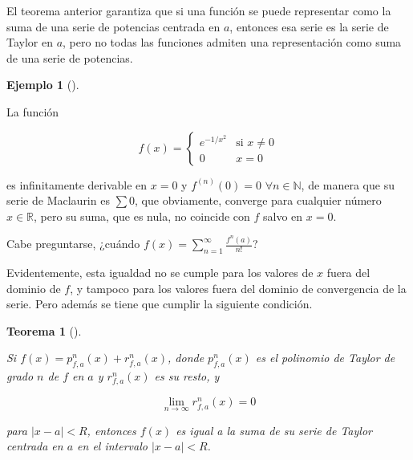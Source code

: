 \documentclass[
  a4paper,
]{scrreport}
\theoremstyle{plain}
\theoremstyle{plain}
\theoremstyle{definition}
\theoremstyle{definition}
\newtheorem{example}{Ejemplo}[chapter]
\theoremstyle{plain}
\newtheorem{theorem}{Teorema}[chapter]
\theoremstyle{remark}
\begin{document}
\begin{tcolorbox}[enhanced jigsaw, breakable, bottomrule=.15mm, coltitle=black, bottomtitle=1mm, opacityback=0, title=\textcolor{quarto-callout-warning-color}{\faExclamationTriangle}\hspace{0.5em}{Advertencia}, left=2mm, toptitle=1mm, toprule=.15mm, opacitybacktitle=0.6, colframe=quarto-callout-warning-color-frame, arc=.35mm, colback=white, rightrule=.15mm, titlerule=0mm, leftrule=.75mm, colbacktitle=quarto-callout-warning-color!10!white]

El teorema anterior garantiza que si una función se puede representar
como la suma de una serie de potencias centrada en \(a\), entonces esa
serie es la serie de Taylor en \(a\), pero no todas las funciones
admiten una representación como suma de una serie de potencias.

\end{tcolorbox}

\leavevmode{}%
\begin{example}[]\label{exm-funcion-no-coincidente-serie-taylor}

La función

\[
f(x) =
\begin{cases}
e^{-1/x^2} & \mbox{si $x\neq 0$}\\
0 & \mbox{$x=0$}
\end{cases}
\]

es infinitamente derivable en \(x=0\) y \(f^{(n)}(0)=0\)
\(\forall n\in\mathbb{N}\), de manera que su serie de Maclaurin es
\(\sum 0\), que obviamente, converge para cualquier número
\(x\in\mathbb{R}\), pero su suma, que es nula, no coincide con \(f\)
salvo en \(x=0\).

\end{example}

Cabe preguntarse, ¿cuándo
\(f(x)=\sum_{n=1}^\infty \frac{f^{n}(a)}{n!}\)?

Evidentemente, esta igualdad no se cumple para los valores de \(x\)
fuera del dominio de \(f\), y tampoco para los valores fuera del dominio
de convergencia de la serie. Pero además se tiene que cumplir la
siguiente condición.

\leavevmode{}%
\begin{theorem}[]\label{thm-condicion-serie-taylor}

Si \(f(x)=p_{f,a}^n(x) + r_{f,a}^n(x)\), donde \(p_{f,a}^n(x)\) es el
polinomio de Taylor de grado \(n\) de \(f\) en \(a\) y \(r_{f,a}^n(x)\)
es su resto, y

\[
\lim_{n\to\infty} r_{f,a}^n(x) = 0
\]

para \(|x-a|<R\), entonces \(f(x)\) es igual a la suma de su serie de
Taylor centrada en \(a\) en el intervalo \(|x-a|<R\).

\end{theorem}
\end{document}
